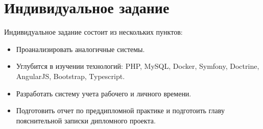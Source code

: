 \section{Индивидуальное задание}
\label{sec:practice:individual_task}
Индивидуальное задание состоит из нескольких пунктов:
\begin{itemize}
  \item Проанализировать аналогичные системы.
  \item Углубится в изучении технологий: PHP, MySQL, Docker, Symfony, Doctrine, AngularJS, Bootstrap, Typescript.
  \item Разработать систему учета рабочего и личного времени.
  \item Подготовить отчет по преддипломной практике и подготоить главу пояснительной записки дипломного проекта.
\end{itemize}